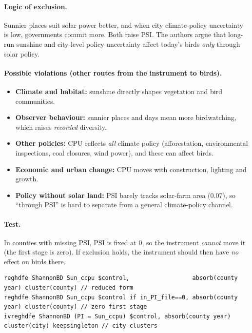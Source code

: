\documentclass[11pt]{article}
\begin{document}
\paragraph{Logic of exclusion.} Sunnier places suit solar power better, and when city climate-policy uncertainty is low, governments commit more. Both raise PSI. The authors argue that long-run sunshine and city-level policy uncertainty affect today's birds \emph{only} through solar policy.

\paragraph{Possible violations (other routes from the instrument to birds).}
\begin{itemize}
\item \textbf{Climate and habitat:} sunshine directly shapes vegetation and bird communities.
\item \textbf{Observer behaviour:} sunnier places and days mean more birdwatching, which raises \emph{recorded} diversity.
\item \textbf{Other policies:} CPU reflects \emph{all} climate policy (afforestation, environmental inspections, coal closures, wind power), and these can affect birds.
\item \textbf{Economic and urban change:} CPU moves with construction, lighting and growth.
\item \textbf{Policy without solar land:} PSI barely tracks solar-farm area (0.07), so ``through PSI'' is hard to separate from a general climate-policy channel.
\end{itemize}

\paragraph{Test.} In counties with missing PSI, PSI is fixed at 0, so the instrument \emph{cannot} move it (the first stage is zero). If exclusion holds, the instrument should then have \emph{no} effect on birds there.
\begin{lstlisting}
reghdfe ShannonBD Sun_ccpu $control,                  absorb(county year) cluster(county) // reduced form
reghdfe ShannonBD Sun_ccpu $control if in_PI_file==0, absorb(county year) cluster(county) // zero first stage
ivreghdfe ShannonBD (PI = Sun_ccpu) $control, absorb(county year) cluster(city) keepsingleton // city clusters
\end{lstlisting}
\end{document}
